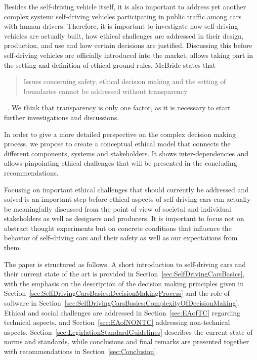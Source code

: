 Besides the self-driving vehicle itself, it is also important to address  yet another complex system: self-driving vehicles participating in public traffic among cars with human drivers. Therefore, it is important to investigate how self-driving vehicles are actually built, how ethical challenges are addressed in their design, production, and use and how certain decisions are justified. Discussing this before self-driving vehicles are officially introduced into the market, allows taking part in the setting and definition of ethical ground rules. McBride states that \blockquote{Issues concerning safety, ethical decision making and the setting of boundaries cannot be addressed without transparency}~\cite{McBride:2016:EDC:2874239.2874265}. We think that transparency is only one factor, as it is necessary to start further investigations and discussions. 

In order to give a more detailed perspective on the complex decision making process, we propose to create a conceptual ethical model that connects the different components, systems and stakeholders. It shows inter-dependencies and allows pinpointing ethical challenges that will be presented in the concluding recommendations.

Focusing on important ethical challenges that should currently be addressed and solved is an important step before ethical aspects of self-driving cars can actually be meaningfully discussed from the point of view of societal and individual stakeholders as well as designers and producers. It is important to focus not on abstract thought experiments but on concrete conditions that influence the behavior of self-driving cars and their safety as well as our expectations from them.

The paper is structured as follows. A short introduction to self-driving cars and their current state of the art is provided in Section~\ref{sec:SelfDrivingCarsBasics}, with the emphasis on the description of the decision making principles given in Section~\ref{sec:SelfDrivingCarsBasics:DecisionMakingProcess} and the role of software in Section~\ref{sec:SelfDrivingCarsBasics:ComplexityOfDecisionMaking}. Ethical and social challenges are addressed in Section~\ref{sec:EAofTC} regarding technical aspects, and Section~\ref{sec:EAofNONTC} addressing non-technical aspects. Section~\ref{sec:LegislationStandardGuidelines} describes the current state of norms and standards, while conclusions and final remarks are  presented together with recommendations in Section~\ref{sec:Conclusion}.


